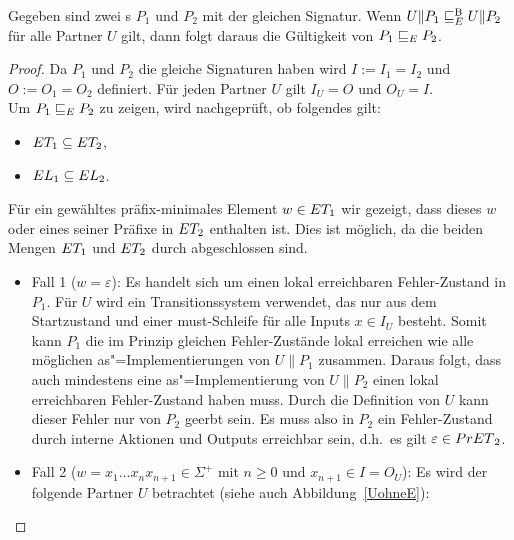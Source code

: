 \begin{Lem}
  \label{KommVerfeinLem}
  Gegeben sind zwei \MEIO{}s $P_1$ und $P_2$ mit der gleichen Signatur. Wenn
  $U\|P_1 \sqsubseteq  _E^\mathrm{B}{} U\|P_2$ für alle Partner $U$ gilt, dann folgt daraus die
  Gültigkeit von $P_1 \sqsubseteq  _E{} P_2$.
\end{Lem}
\begin{proof}
  Da $P_1$ und $P_2$ die gleiche Signaturen haben wird $I:=I_1=I_2$ und
  $O:=O_1=O_2$ definiert. Für jeden Partner $U$ gilt $I_U=O$ und $O_U=I$.\\
  Um $P_1 \sqsubseteq  _E{}P_2$ zu zeigen, wird nachgeprüft, ob folgendes gilt:
  \begin{itemize}
    \item $ET _1\subseteq ET _2$,
    \item $EL _1\subseteq EL _2$.
  \end{itemize}
  Für ein gewähltes präfix-minimales Element $w\in ET _1$ wir gezeigt, dass
  dieses $w$ oder eines seiner Präfixe in $ET _2$ enthalten ist. Dies ist
  möglich, da die beiden Mengen $ET _1$ und $ET _2$ durch \cont{}
  abgeschlossen sind.
  \begin{itemize}
    \item Fall 1 ($w=\varepsilon$): Es handelt sich um einen lokal erreichbaren
      Fehler-Zustand in $P_1$. Für $U$ wird ein Transitionssystem verwendet,
      das nur aus dem Startzustand und einer must-Schleife für alle Inputs
      $x\in I_U$ besteht. Somit kann $P_1$ die im Prinzip gleichen
      Fehler-Zustände lokal erreichen wie alle möglichen as"=Implementierungen
      von $U\|P_1$ zusammen. Daraus folgt, dass auch mindestens eine
      as"=Implementierung von $U\|P_2$ einen lokal erreichbaren Fehler-Zustand
      haben muss. Durch die Definition von $U$ kann dieser Fehler nur von $P_2$
      geerbt sein. Es muss also in $P_2$ ein Fehler-Zustand durch interne
      Aktionen und Outputs erreichbar sein, d.h.\ es gilt $\varepsilon\in
      PrET{}_2$.
    \item Fall 2 ($w=x_1\dots x_n x_{n+1}\in\Sigma ^+$ mit $n\geq 0$ und
      $x_{n+1}\in I = O_U$): Es wird der folgende Partner $U$ betrachtet (siehe
      auch Abbildung~\ref{UohneE}):
\end{itemize}
\end{proof}
